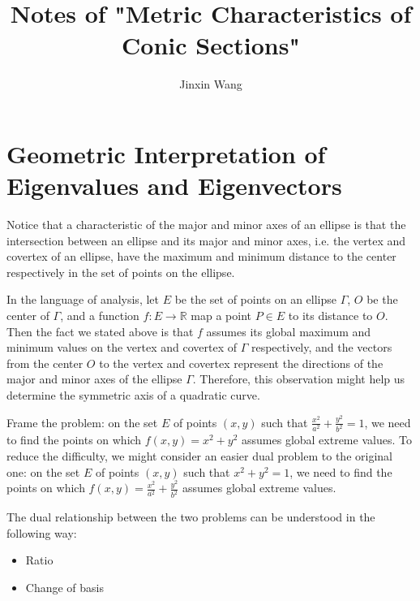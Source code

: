 \documentclass[onecolumn]{ctexart}
\title{Notes of "Metric Characteristics of Conic Sections"}
\author{Jinxin Wang}
\date{}
\begin{document}
\maketitle

\section{Geometric Interpretation of Eigenvalues and Eigenvectors}

Notice that a characteristic of the major and minor axes of an ellipse is that 
the intersection between an ellipse and its major and minor axes, i.e. the vertex 
and covertex of an ellipse, have the maximum and minimum distance to the center 
respectively in the set of points on the ellipse.

In the language of analysis, let $E$ be the set of points on an ellipse 
$\varGamma$, $O$ be the center of $\varGamma$, and a function $f: E \to 
\mathbb{R}$ map a point $P \in E$ to its distance to $O$. Then the fact we stated 
above is that $f$ assumes its global maximum and minimum values on the vertex and 
covertex of $\varGamma$ respectively, and the vectors from the center $O$ to the 
vertex and covertex represent the directions of the major and minor axes of the 
ellipse $\varGamma$. Therefore, this observation might help us determine the 
symmetric axis of a quadratic curve.

Frame the problem: on the set $E$ of points $(x, y)$ such that $\frac{x^2}{a^2} 
+ \frac{y^2}{b^2} = 1$, we need to find the points on which $f(x, y) = x^2 + y^2$ 
assumes global extreme values. To reduce the difficulty, we might consider an 
easier dual problem to the original one: on the set $E$ of points $(x, y)$ such 
that $x^2 + y^2 = 1$, we need to find the points on which $f(x, y) = 
\frac{x^2}{a^2} + \frac{y^2}{b^2}$ assumes global extreme values.

The dual relationship between the two problems can be understood in the following 
way:
\begin{itemize}
  \item Ratio
  
  \item Change of basis
\end{itemize}
\end{document}
